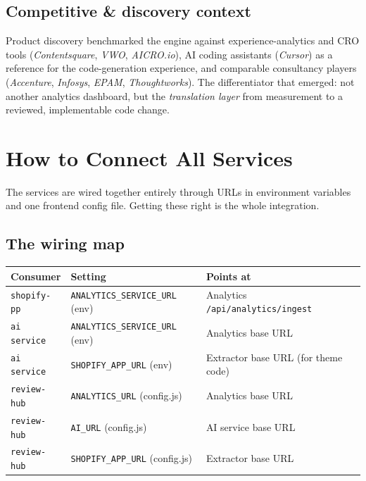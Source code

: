 \documentclass[11pt,a4paper]{article}
\begin{document}
\subsection{Competitive \& discovery context}

Product discovery benchmarked the engine against experience-analytics and CRO
tools (\emph{Contentsquare}, \emph{VWO}, \emph{AICRO.io}), AI coding assistants
(\emph{Cursor}) as a reference for the code-generation experience, and
comparable consultancy players (\emph{Accenture}, \emph{Infosys}, \emph{EPAM},
\emph{Thoughtworks}). The differentiator that emerged: not another analytics
dashboard, but the \emph{translation layer} from measurement to a reviewed,
implementable code change.

\section{How to Connect All Services}\label{sec:connect}

The services are wired together entirely through URLs in environment variables
and one frontend config file. Getting these right is the whole integration.

\subsection{The wiring map}

\begin{center}
\begin{tabularx}{\textwidth}{@{}l l Y@{}}
\toprule
\textbf{Consumer} & \textbf{Setting} & \textbf{Points at}\\
\midrule
\texttt{shopify-pp} & \texttt{ANALYTICS\_SERVICE\_URL} (env) & Analytics \texttt{/api/analytics/ingest}\\
\texttt{ai service} & \texttt{ANALYTICS\_SERVICE\_URL} (env) & Analytics base URL\\
\texttt{ai service} & \texttt{SHOPIFY\_APP\_URL} (env) & Extractor base URL (for theme code)\\
\texttt{review-hub} & \texttt{ANALYTICS\_URL} (config.js) & Analytics base URL\\
\texttt{review-hub} & \texttt{AI\_URL} (config.js) & AI service base URL\\
\texttt{review-hub} & \texttt{SHOPIFY\_APP\_URL} (config.js) & Extractor base URL\\
\bottomrule
\end{tabularx}
\end{center}
\end{document}

